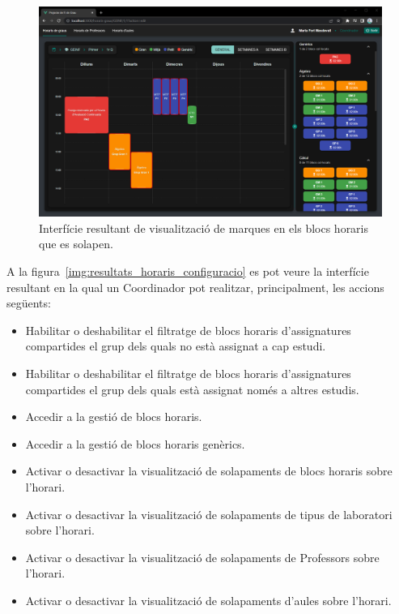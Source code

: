 \documentclass[a4paper,12pt]{ThesisStyle}
\begin{document}
\begin{figure}[H]
  \centering
  \includegraphics[width=\textwidth]{assets/results/horaris/solapamentMarques.png}
  \caption{\label{img:resultats_horaris_solapamentMarques}Interfície resultant de visualització de marques en els blocs horaris que es solapen.}
\end{figure}

\newpage

A la figura~\ref{img:resultats_horaris_configuracio} es pot veure la interfície resultant en la qual un Coordinador pot realitzar, principalment, les accions següents:
\begin{itemize}
  \item Habilitar o deshabilitar el filtratge de blocs horaris d'assignatures compartides el grup dels quals no està assignat a cap estudi.
  \item Habilitar o deshabilitar el filtratge de blocs horaris d'assignatures compartides el grup dels quals està assignat només a altres estudis.
  \item Accedir a la gestió de blocs horaris.
  \item Accedir a la gestió de blocs horaris genèrics.
  \item Activar o desactivar la visualització de solapaments de blocs horaris sobre l'horari.
  \item Activar o desactivar la visualització de solapaments de tipus de laboratori sobre l'horari.
  \item Activar o desactivar la visualització de solapaments de Professors sobre l'horari.
  \item Activar o desactivar la visualització de solapaments d'aules sobre l'horari.
\end{itemize}
\end{document}
